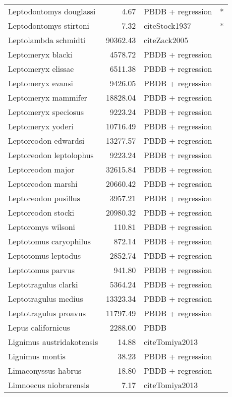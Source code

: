 \begin{table}[ht]
\begin{tabular}{lrll}
  Leptodontomys douglassi & 4.67 & PBDB + regression & * \\ 
  Leptodontomys stirtoni & 7.32 & cite{Stock1937} & * \\ 
  Leptolambda schmidti & 90362.43 & cite{Zack2005} &  \\ 
  Leptomeryx blacki & 4578.72 & PBDB + regression &  \\ 
  Leptomeryx elissae & 6511.38 & PBDB + regression &  \\ 
  Leptomeryx evansi & 9426.05 & PBDB + regression &  \\ 
  Leptomeryx mammifer & 18828.04 & PBDB + regression &  \\ 
  Leptomeryx speciosus & 9223.24 & PBDB + regression &  \\ 
  Leptomeryx yoderi & 10716.49 & PBDB + regression &  \\ 
  Leptoreodon edwardsi & 13277.57 & PBDB + regression &  \\ 
  Leptoreodon leptolophus & 9223.24 & PBDB + regression &  \\ 
  Leptoreodon major & 32615.84 & PBDB + regression &  \\ 
  Leptoreodon marshi & 20660.42 & PBDB + regression &  \\ 
  Leptoreodon pusillus & 3957.21 & PBDB + regression &  \\ 
  Leptoreodon stocki & 20980.32 & PBDB + regression &  \\ 
  Leptoromys wilsoni & 110.81 & PBDB + regression &  \\ 
  Leptotomus caryophilus & 872.14 & PBDB + regression &  \\ 
  Leptotomus leptodus & 2852.74 & PBDB + regression &  \\ 
  Leptotomus parvus & 941.80 & PBDB + regression &  \\ 
  Leptotragulus clarki & 5364.24 & PBDB + regression &  \\ 
  Leptotragulus medius & 13323.34 & PBDB + regression &  \\ 
  Leptotragulus proavus & 11797.49 & PBDB + regression &  \\ 
  Lepus californicus & 2288.00 & PBDB &  \\ 
  Lignimus austridakotensis & 14.88 & cite{Tomiya2013} &  \\ 
  Lignimus montis & 38.23 & PBDB + regression &  \\ 
  Limaconyssus habrus & 18.80 & PBDB + regression &  \\ 
  Limnoecus niobrarensis & 7.17 & cite{Tomiya2013} &  \\ 

\end{tabular}
\end{table}
